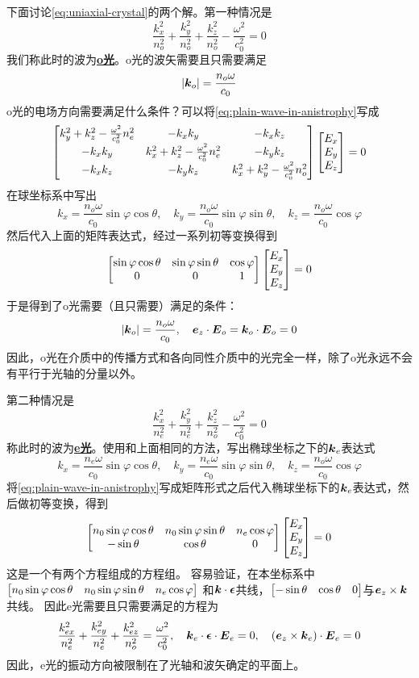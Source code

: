 \documentclass[UTF8, a4paper]{ctexart}
\newcommand*{\concept}[1]{\underline{\textbf{#1}}}
\begin{document}
下面讨论\eqref{eq:uniaxial-crystal}的两个解。第一种情况是
\[
    \frac{k_x^2}{n_o^2} + \frac{k_y^2}{n_o^2} + \frac{k_z^2}{n_o^2} - \frac{\omega^2}{c_0^2} = 0
\]
我们称此时的波为\concept{o光}。o光的波矢需要且只需要满足
\[
    \abs{\vb*{k}_o} = \frac{n_o \omega}{c_0}
\]
o光的电场方向需要满足什么条件？可以将\eqref{eq:plain-wave-in-anistrophy}写成
\[
    \bmqty{
        k_y^2 + k_z^2 - \frac{\omega^2}{c_0^2} n_e^2 & -k_x k_y & - k_x k_z \\
        - k_x k_y & k_x^2 + k_z^2 - \frac{\omega^2}{c_0^2} n_e^2 & -k_y k_z \\
        -k_x k_z & -k_y k_z & k_x^2 + k_y^2 - \frac{\omega^2}{c_0^2} n_o^2
    }
    \bmqty{
        E_x \\ E_y \\ E_z
    } = 0
\]
在球坐标系中写出
\[
    k_x = \frac{n_o \omega}{c_0} \sin \varphi \cos \theta, 
    \quad k_y = \frac{n_o \omega}{c_0} \sin \varphi \sin \theta, \quad k_z = \frac{n_o \omega}{c_0} \cos \varphi
\]
然后代入上面的矩阵表达式，经过一系列初等变换得到
\[
    \bmqty{
        \sin \varphi \cos \theta & \sin \varphi \sin \theta & \cos \varphi \\
        0 & 0 & 1
    }
    \bmqty{E_x \\ E_y \\ E_z} = 0
\]
于是得到了o光需要（且只需要）满足的条件：
\begin{equation}
    \abs{\vb*{k}_o} = \frac{n_o \omega}{c_0}, \quad\vb*{e}_z \cdot \vb*{E}_o = \vb*{k}_o \cdot \vb*{E}_o = 0
    \label{eq:o-light}
\end{equation}
因此，o光在介质中的传播方式和各向同性介质中的光完全一样，除了o光永远不会有平行于光轴的分量以外。

第二种情况是
\[
    \frac{k_x^2}{n_e^2} + \frac{k_y^2}{n_e^2} + \frac{k_z^2}{n_o^2} - \frac{\omega^2}{c_0^2} = 0
\]
称此时的波为\concept{e光}。使用和上面相同的方法，写出椭球坐标之下的$\vb*{k}_e$表达式
\[
    k_x = \frac{n_e \omega}{c_0} \sin \varphi \cos \theta, \quad k_y = \frac{n_e \omega}{c_0} \sin \varphi \sin \theta, \quad k_z = \frac{n_o \omega}{c_0} \cos \varphi
\]
将\eqref{eq:plain-wave-in-anistrophy}写成矩阵形式之后代入椭球坐标下的$\vb*{k}_e$表达式，然后做初等变换，得到
\[
    \bmqty{
        n_0 \sin \varphi \cos \theta & n_0 \sin \varphi \sin \theta & n_e \cos \varphi \\
        -\sin \theta & \cos \theta & 0
    }
    \bmqty{E_x \\ E_y \\ E_z} = 0
\]
这是一个有两个方程组成的方程组。
容易验证，在本坐标系中$\bmqty{n_0 \sin \varphi \cos \theta & n_0 \sin \varphi \sin \theta & n_e \cos \varphi}$
和$\vb*{k} \cdot \vb*{\epsilon}$共线，$\bmqty{-\sin \theta & \cos \theta & 0}$与$\vb*{e}_z \times \vb*{k}$共线。
因此e光需要且只需要满足的方程为
\begin{equation}
    \frac{k_{ex}^2}{n_e^2} + \frac{k_{ey}^2}{n_e^2} + \frac{k_{ez}^2}{n_o^2} =
    \frac{\omega^2}{c_0^2}, \quad \vb*{k}_e \cdot \vb*{\epsilon} \cdot \vb*{E}_e = 0, \quad (\vb*{e}_z \times \vb*{k}_e) \cdot \vb*{E}_e = 0
    \label{eq:e-light}
\end{equation}
因此，e光的振动方向被限制在了光轴和波矢确定的平面上。
\end{document}
